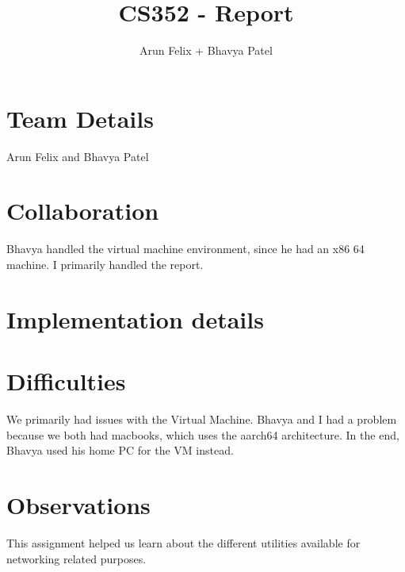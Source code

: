 \documentclass{article}
\title{CS352 - Report}
\author{Arun Felix + Bhavya Patel}
\begin{document}
\maketitle
\section{Team Details}

Arun Felix and Bhavya Patel

\section{Collaboration}

Bhavya handled the virtual machine environment, since he had an x86 64 machine. I primarily handled the report.

\section{Implementation details}

\section{Difficulties}

We primarily had issues with the Virtual Machine. Bhavya and I had a problem because we both had macbooks, which uses the aarch64 architecture. In the end, Bhavya used his home PC for the VM instead. 


\section{Observations}

This assignment helped us learn about the different utilities available for networking related purposes. 
\end{document}
